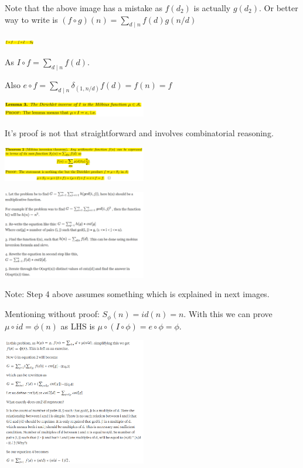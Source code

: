 \documentclass[8pt, a4paper, oneside, twocolumn]{extarticle}
\begin{document}
Note that the above image has a mistake as $f(d_2)$ is actually $g(d_2)$. Or better way to write is $(f \circ g)(n) = \sum_{d\mid n} f(d)g(n/d)$

\includegraphics[width=0.1\textwidth,height=0.1\textheight,keepaspectratio]{assets/mob4}

As $I\circ f = \sum_{d \mid n} f(d)$.

Also $e\circ f = \sum_{d\mid n}\delta_{(1, n/d)}f(d) = f(n) = f$ 

\includegraphics[width=0.47\textwidth,height=0.47\textheight,keepaspectratio]{assets/mob5}

It's proof is not that straightforward and involves combinatorial reasoning.

\includegraphics[width=0.47\textwidth,height=0.47\textheight,keepaspectratio]{assets/mob6}

\includegraphics[width=0.47\textwidth,height=0.47\textheight,keepaspectratio]{assets/mob7}

Note: Step 4 above assumes something which is explained in next images.

Mentioning without proof: $S_{\phi}(n) = id(n) = n$. With this we can prove $\mu \circ id = \phi (n)$ as LHS is $\mu \circ (I \circ \phi) = e \circ \phi = \phi$.

\includegraphics[width=0.47\textwidth,height=0.47\textheight,keepaspectratio]{assets/mobnew}
\end{document}
